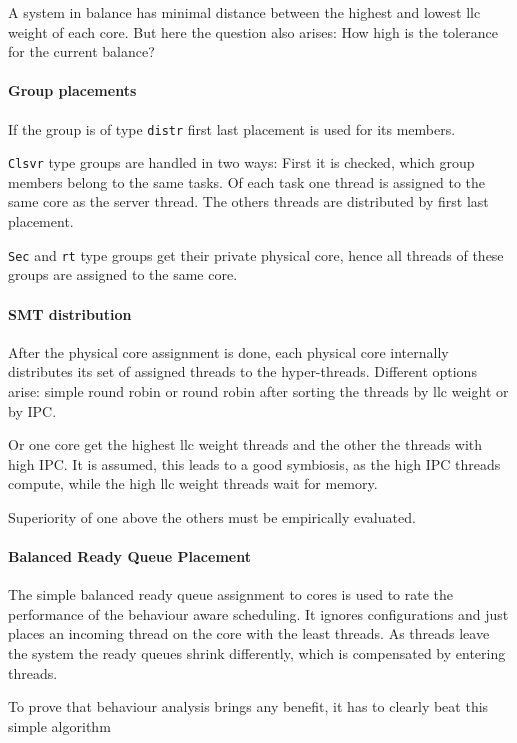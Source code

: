 A system in balance has minimal distance between the highest and lowest
\gls{llc} weight of each core.
But here the question also arises: How high is the tolerance for the current
balance?


\paragraph{Group placements}
If the group is of type \texttt{distr} first last placement is used for its
members.

\texttt{Clsvr} type groups are handled in two ways: First it is checked, which
group members belong to the same tasks.
Of each task one thread is assigned to the same core as the server thread.
The others threads are distributed by first last placement.

\texttt{Sec} and \texttt{rt} type groups get their private physical core, hence
all threads of these groups are assigned to the same core.


\paragraph{SMT distribution}
After the physical core assignment is done, each physical core internally
distributes its set of assigned threads to the hyper-threads.
Different options arise: simple round robin or round robin after sorting the
threads by \gls{llc} weight or by IPC.

Or one core get the highest \gls{llc} weight threads and the other the threads
with high IPC.
It is assumed, this leads to a good symbiosis, as the high IPC threads compute,
while the high \gls{llc} weight threads wait for memory.

Superiority of one above the others must be empirically evaluated.


\paragraph{Balanced Ready Queue Placement}
The simple balanced ready queue assignment to cores is used to rate the
performance of the behaviour aware scheduling.
It ignores configurations and just places an incoming thread on the core with
the least threads.
As threads leave the system the ready queues shrink differently, which is
compensated by entering threads.

To prove that behaviour analysis brings any benefit, it has to clearly beat
this simple algorithm




